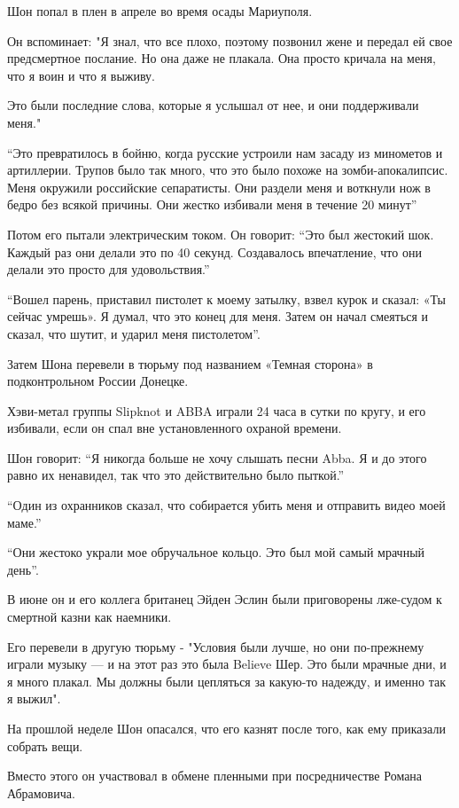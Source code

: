 Шон попал в плен в апреле во время осады Мариуполя.

Он вспоминает: "Я знал, что все плохо, поэтому позвонил жене и передал ей свое
предсмертное послание. Но она даже не плакала. Она просто кричала на меня, что
я воин и что я выживу.

Это были последние слова, которые я услышал от нее, и они поддерживали меня."

\enquote{Это превратилось в бойню, когда русские устроили нам засаду из минометов и
артиллерии.  Трупов было так много, что это было похоже на зомби-апокалипсис.
Меня окружили российские сепаратисты. Они раздели меня и воткнули нож в бедро
без всякой причины.  Они жестко избивали меня в течение 20 минут}

Потом его пытали электрическим током. Он говорит: \enquote{Это был жестокий шок. Каждый
раз они делали это по 40 секунд. Создавалось впечатление, что они делали это
просто для удовольствия.}

\enquote{Вошел парень, приставил пистолет к моему затылку, взвел курок и сказал: «Ты сейчас умрешь».
Я думал, что это конец для меня. Затем он начал смеяться и сказал, что шутит, и ударил меня пистолетом}.

Затем Шона перевели в тюрьму под названием «Темная сторона» в подконтрольном России Донецке.

Хэви-метал группы Slipknot и ABBA играли 24 часа в сутки по кругу, и его избивали, если он спал вне установленного охраной времени.

Шон говорит: \enquote{Я никогда больше не хочу слышать песни Abba. Я и до этого равно их ненавидел, так что это действительно было пыткой.}

\enquote{Один из охранников сказал, что собирается убить меня и отправить видео моей маме.}

\enquote{Они жестоко украли мое обручальное кольцо. Это был мой самый мрачный день}.

В июне он и его коллега британец Эйден Эслин были приговорены лже-судом к смертной казни как наемники.

Его перевели в другую тюрьму - "Условия были лучше, но они по-прежнему играли
музыку — и на этот раз это была Believe Шер.  Это были мрачные дни, и я много
плакал. Мы должны были цепляться за какую-то надежду, и именно так я выжил".

На прошлой неделе Шон опасался, что его казнят после того, как ему приказали собрать вещи.

Вместо этого он участвовал в обмене пленными при посредничестве Романа Абрамовича.


